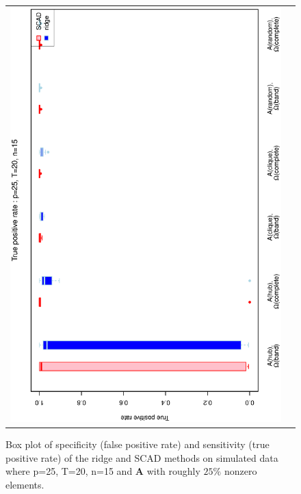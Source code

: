 \begin{figure}[h!]
\begin{tabular}{cc}
\includegraphics[scale=0.45,angle=270]{ROCtpr25T20N15_25.eps}
\end{tabular}
\caption{Box plot of specificity (false positive rate) and sensitivity (true positive rate) of the ridge and SCAD methods on simulated data where p=25, T=20,  n=15 and $\mathbf{A}$ with roughly $25\%$ nonzero elements.}
\label{figSM:RocP25T20N15_25}
\end{figure}


